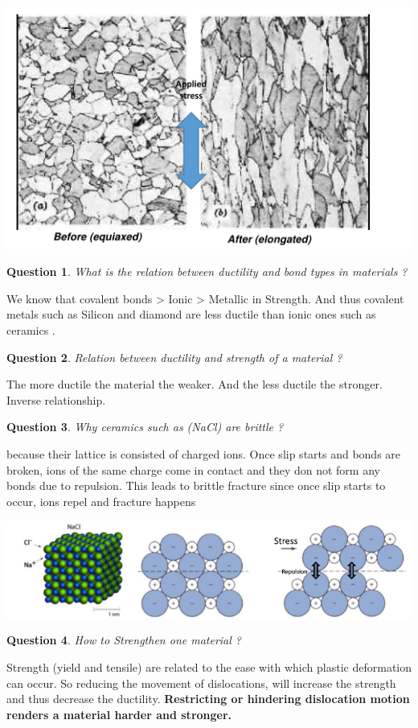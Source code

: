 \documentclass[13]{article}
\newtheorem{exer}{Question}
\begin{document}
\begin{center}
\includegraphics[scale=0.5]{figures/16.png}
\end{center}
\begin{exer}
What is the relation between ductility and bond types in materials ?
\end{exer}
We know that covalent bonds > Ionic > Metallic in Strength. And thus covalent metals such as Silicon and diamond are less ductile than ionic ones such as ceramics .
\begin{exer}
Relation between ductility and strength of a material ?
\end{exer}
The more ductile the material the weaker. And the less ductile the stronger. Inverse relationship.
\begin{exer}
	Why ceramics such as (NaCl) are brittle ?
\end{exer}
because their lattice is consisted of charged ions. Once slip starts and bonds are broken, ions of the same charge come in contact and they don not form any bonds due to repulsion. This leads to brittle fracture since once slip starts to occur, ions repel and fracture happens 
\begin{center}
\includegraphics[scale=0.5]{figures/17.png}
\end{center}
\begin{exer}
How to Strengthen one material ?
\end{exer}
Strength (yield and tensile) are related to the ease with which plastic deformation can occur. So reducing the movement of dislocations, will increase the strength and thus decrease the ductility. \textbf{Restricting or hindering dislocation motion renders a material harder and stronger.}  
\end{document}
